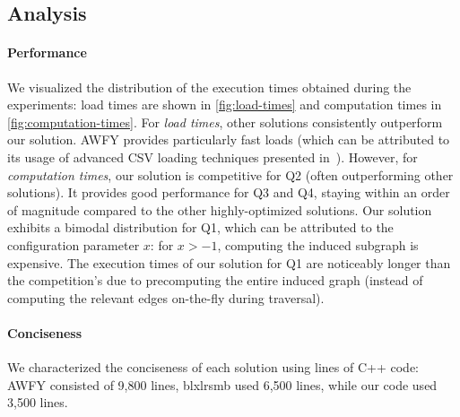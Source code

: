 \subsection{Analysis}

\paragraph{Performance}
%
We visualized the distribution of the execution times obtained during the experiments:
load times are shown in \autoref{fig:load-times} and
computation times in \autoref{fig:computation-times}.
For \emph{load times}, other solutions consistently outperform our solution. AWFY provides particularly fast loads (which can be attributed to its usage of advanced CSV loading techniques presented in~\cite{DBLP:journals/pvldb/MuhlbauerRSRK013}).
However, for \emph{computation times}, our solution is competitive for Q2 (often outperforming other solutions). It provides good performance for Q3 and Q4, staying within an order of magnitude compared to the other highly-optimized solutions.
Our solution exhibits a bimodal distribution for Q1, which can be attributed to the configuration parameter $x$: for $x > -1$, computing the induced subgraph is expensive.
The execution times of our solution for Q1 are noticeably longer than the competition's due to precomputing the entire induced graph (instead of computing the relevant edges on-the-fly during traversal).

\paragraph{Conciseness}
%
We characterized the conciseness of each solution using lines of C++ code: %
AWFY consisted of 9,800 lines, 
blxlrsmb used 6,500 lines,
while our code used 3,500 lines.


